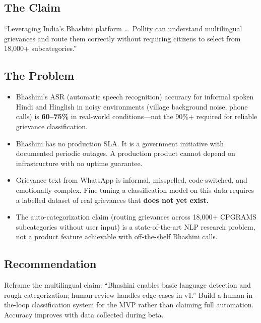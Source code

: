\documentclass[12pt, a4paper]{article}
\begin{document}
\subsection{The Claim}
``Leveraging India's Bhashini platform \ldots\ Pollity can understand multilingual grievances and route them correctly without requiring citizens to select from 18,000+ subcategories.''

\subsection{The Problem}

\begin{itemize}[leftmargin=1.5em]
    \item Bhashini's ASR (automatic speech recognition) accuracy for informal spoken Hindi and Hinglish in noisy environments (village background noise, phone calls) is \textbf{60--75\%} in real-world conditions---not the 90\%+ required for reliable grievance classification.
    \item Bhashini has no production SLA. It is a government initiative with documented periodic outages. A production product cannot depend on infrastructure with no uptime guarantee.
    \item Grievance text from WhatsApp is informal, misspelled, code-switched, and emotionally complex. Fine-tuning a classification model on this data requires a labelled dataset of real grievances that \textbf{does not yet exist.}
    \item The auto-categorization claim (routing grievances across 18,000+ CPGRAMS subcategories without user input) is a state-of-the-art NLP research problem, not a product feature achievable with off-the-shelf Bhashini calls.
\end{itemize}

\subsection{Recommendation}
Reframe the multilingual claim: ``Bhashini enables basic language detection and rough categorization; human review handles edge cases in v1.'' Build a human-in-the-loop classification system for the MVP rather than claiming full automation. Accuracy improves with data collected during beta.

\newpage

\end{document}
